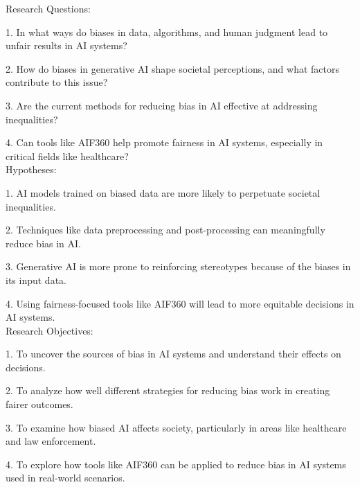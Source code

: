 \documentclass[a4paper, 12pt]{article}
\begin{document}
Research Questions:

1. In what ways do biases in data, algorithms, and human judgment lead to unfair results in AI systems?

2. How do biases in generative AI shape societal perceptions, and what factors contribute to this issue?

3. Are the current methods for reducing bias in AI effective at addressing inequalities?

4. Can tools like AIF360 help promote fairness in AI systems, especially in critical fields like healthcare?\\


Hypotheses:

1. AI models trained on biased data are more likely to perpetuate societal inequalities.

2. Techniques like data preprocessing and post-processing can meaningfully reduce bias in AI.

3. Generative AI is more prone to reinforcing stereotypes because of the biases in its input data.

4. Using fairness-focused tools like AIF360 will lead to more equitable decisions in AI systems.\\

Research Objectives:

1. To uncover the sources of bias in AI systems and understand their effects on decisions.

2. To analyze how well different strategies for reducing bias work in creating fairer outcomes.

3. To examine how biased AI affects society, particularly in areas like healthcare and law enforcement.
 
4. To explore how tools like AIF360 can be applied to reduce bias in AI systems used in real-world scenarios.
\end{document}

